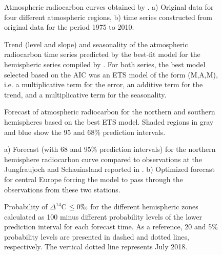 \documentclass[a4paper, 11pt]{article}
\begin{document}
\begin{figure}[htbp]
   \centering
   \caption{Atmospheric radiocarbon curves obtained by \citet{Hua2013Radiocarbon}. a) Original data for four different atmospheric regions, b) time series constructed from original data for the period 1975 to 2010.}
   \label{fig:HuaSeries}
\end{figure}

\begin{figure}[htbp]
   \centering
   \caption{Trend (level and slope) and seasonality of the atmospheric radiocarbon time series predicted by the best-fit model for the hemispheric series compiled by \citet{Hua2013Radiocarbon}. For both series, the best model selected based on the AIC was an ETS model of the form (M,A,M), i.e. a multiplicative term for the error, an additive term for the trend, and a multiplicative term for the seasonality. }
   \label{fig:SlopeSeason}
\end{figure}

\begin{figure}[htbp]
   \centering
   \caption{Forecast of atmospheric radiocarbon for the northern and southern hemispheres based on the best ETS model. Shaded regions in gray and blue show the 95 and 68\% prediction intervals. }
   \label{fig:Forecast}
\end{figure}

\begin{figure}[htbp]
   \centering
   \caption{a) Forecast (with 68 and 95\% prediction intervals) for the northern hemisphere radiocarbon curve compared to observations at the Jungfraujoch and Schauinsland reported in \citet{Levin2013Tellus}. b) Optimized forecast for central Europe forcing the model to pass through the observations from these two stations.}
   \label{fig:ForecastEurope}
\end{figure}


\begin{figure}[htbp]
   \centering
   \caption{Probability of $\Delta^{14}$C $\leq 0 \permil$ for the different hemispheric zones calculated as 100 minus different probability levels of the lower prediction interval for each forecast time. As a reference, 20 and 5\% probability levels are presented in dashed and dotted lines, respectively. The vertical dotted line represents July 2018.}
   \label{fig:Prob}
\end{figure}
\end{document}
